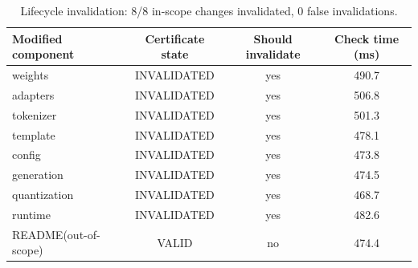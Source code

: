 \begin{table}[t]
\centering
\caption{Lifecycle invalidation: 8/8 in-scope changes invalidated, 0 false invalidations.}
\label{tab:invalidation}
\footnotesize
\begin{tabular}{lccc}
\toprule
Modified component & Certificate state & Should invalidate & Check time (ms) \\
\midrule
weights & INVALIDATED & yes & 490.7 \\
adapters & INVALIDATED & yes & 506.8 \\
tokenizer & INVALIDATED & yes & 501.3 \\
template & INVALIDATED & yes & 478.1 \\
config & INVALIDATED & yes & 473.8 \\
generation & INVALIDATED & yes & 474.5 \\
quantization & INVALIDATED & yes & 468.7 \\
runtime & INVALIDATED & yes & 482.6 \\
README(out-of-scope) & VALID & no & 474.4 \\
\bottomrule
\end{tabular}
\end{table}